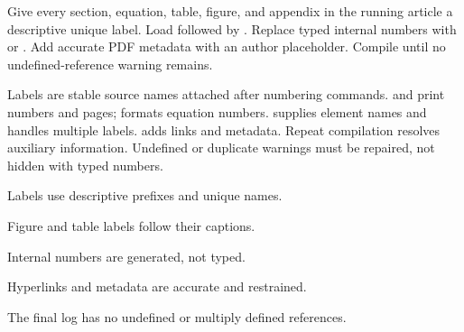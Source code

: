 
\chapterproject

\begin{miniproject}
Give every section, equation, table, figure, and appendix in the running article
a descriptive unique label. Load  followed by .
Replace typed internal numbers with  or . Add accurate PDF
metadata with an author placeholder. Compile until no undefined-reference
warning remains.
\end{miniproject}

\chaptersummary

Labels are stable source names attached after numbering commands. 
and  print numbers and pages;  formats equation
numbers.  supplies element names and handles multiple labels.
 adds links and metadata. Repeat compilation resolves auxiliary
information. Undefined or duplicate warnings must be repaired, not hidden with
typed numbers.

\chaptercheck
\begin{chapterchecklist}
  \item Labels use descriptive prefixes and unique names.
  \item Figure and table labels follow their captions.
  \item Internal numbers are generated, not typed.
  \item Hyperlinks and metadata are accurate and restrained.
  \item The final log has no undefined or multiply defined references.
\end{chapterchecklist}

